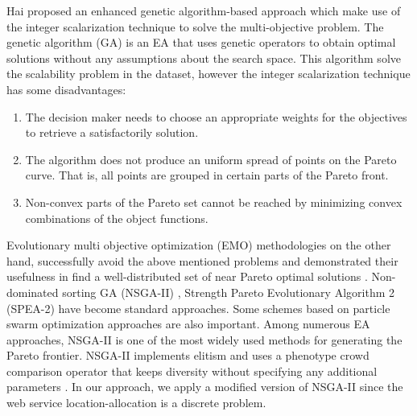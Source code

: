\documentclass{llncs}
\begin{document}
Hai \cite{EnhancedGenetic} proposed an enhanced genetic algorithm-based approach which make use of the integer scalarization technique to solve the multi-objective problem.
The genetic algorithm (GA) is an EA that uses genetic operators to obtain optimal solutions without any assumptions about the search space.
This algorithm solve the scalability problem in the dataset, however the integer scalarization technique \cite{Multiobjective} has some disadvantages: 

\begin{enumerate}
	\item The decision maker needs to choose an appropriate weights for the objectives to retrieve a satisfactorily solution.
	\item The algorithm does not produce an uniform spread of points on the Pareto curve. That is, all points are grouped in certain parts of the Pareto front.
	\item Non-convex parts of the Pareto set cannot be reached by minimizing convex combinations of the object functions.
\end{enumerate}

Evolutionary multi objective optimization (EMO) methodologies on the other hand, successfully avoid the above mentioned problems and demonstrated their usefulness in find a well-distributed set of near Pareto optimal solutions \cite{Aboolian}. Non-dominated sorting GA (NSGA-II) \cite{996017}, Strength Pareto Evolutionary Algorithm 2 (SPEA-2) \cite{Deb} have become standard approaches. 
Some schemes based on particle swarm optimization approaches \cite{Elhossini} \cite{Huang} are also important. 
Among numerous EA approaches, NSGA-II is one of the most widely used methods for generating the Pareto frontier. 
NSGA-II implements elitism and uses a phenotype crowd comparison operator that keeps diversity without specifying any additional parameters \cite{Deb06referencepoint}.
In our approach, we apply a modified version of NSGA-II since the web service location-allocation is a discrete problem. 
\end{document}
